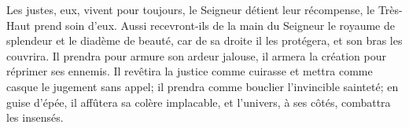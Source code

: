 Les justes, eux, vivent pour toujours,
	le Seigneur détient leur récompense, le Très-Haut prend soin d’eux.
Aussi recevront-ils de la main du Seigneur
		le royaume de splendeur et le diadème de beauté,
	car de sa droite il les protégera, et son bras les couvrira.
Il prendra pour armure son ardeur jalouse,
	il armera la création pour réprimer ses ennemis.
Il revêtira la justice comme cuirasse
	et mettra comme casque le jugement sans appel;
	il prendra comme bouclier l’invincible sainteté;
	en guise d’épée, il affûtera sa colère implacable,
	et l’univers, à ses côtés, combattra les insensés.
